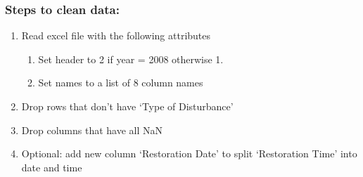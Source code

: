 \documentclass[11pt]{article}
\providecommand{\tightlist}{%
      \setlength{\itemsep}{0pt}\setlength{\parskip}{0pt}}
\begin{document}
    \subsubsection{Steps to clean data:}\label{steps-to-clean-data}

\begin{enumerate}
\def\labelenumi{\arabic{enumi}.}
\tightlist
\item
  Read excel file with the following attributes

  \begin{enumerate}
  \def\labelenumii{\arabic{enumii}.}
  \tightlist
  \item
    Set header to 2 if year = 2008 otherwise 1.\\
  \item
    Set names to a list of 8 column names\\
  \end{enumerate}
\item
  Drop rows that don't have `Type of Disturbance'
\item
  Drop columns that have all NaN\\
\item
  Optional: add new column `Restoration Date' to split `Restoration
  Time' into date and time
\end{enumerate}
\end{document}
